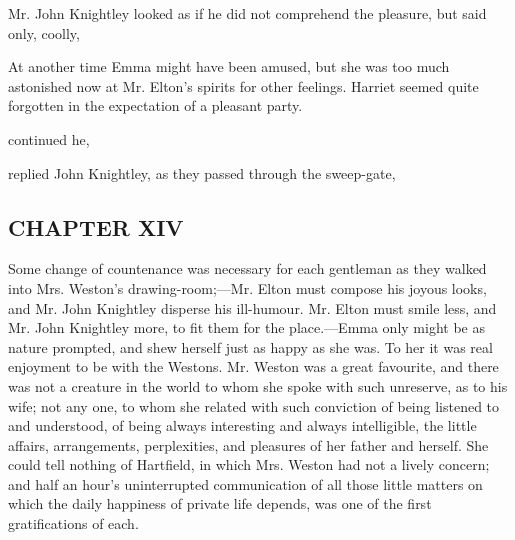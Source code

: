 Mr. John Knightley looked as if he did not comprehend the pleasure, but said only, coolly,


At another time Emma might have been amused, but she was too much astonished now at Mr. Elton's spirits for other feelings. Harriet seemed quite forgotten in the expectation of a pleasant party.

 continued he, 



 replied John Knightley, as they passed through the sweep-gate, 

\subsection[chapter-xiv]{\useURL[url14][][][]\from[url14]CHAPTER XIV}

Some change of countenance was necessary for each gentleman as they walked into Mrs. Weston's drawing-room;---Mr. Elton must compose his joyous looks, and Mr. John Knightley disperse his ill-humour. Mr. Elton must smile less, and Mr. John Knightley more, to fit them for the place.---Emma only might be as nature prompted, and shew herself just as happy as she was. To her it was real enjoyment to be with the Westons. Mr. Weston was a great favourite, and there was not a creature in the world to whom she spoke with such unreserve, as to his wife; not any one, to whom she related with such conviction of being listened to and understood, of being always interesting and always intelligible, the little affairs, arrangements, perplexities, and pleasures of her father and herself. She could tell nothing of Hartfield, in which Mrs. Weston had not a lively concern; and half an hour's uninterrupted communication of all those little matters on which the daily happiness of private life depends, was one of the first gratifications of each.

